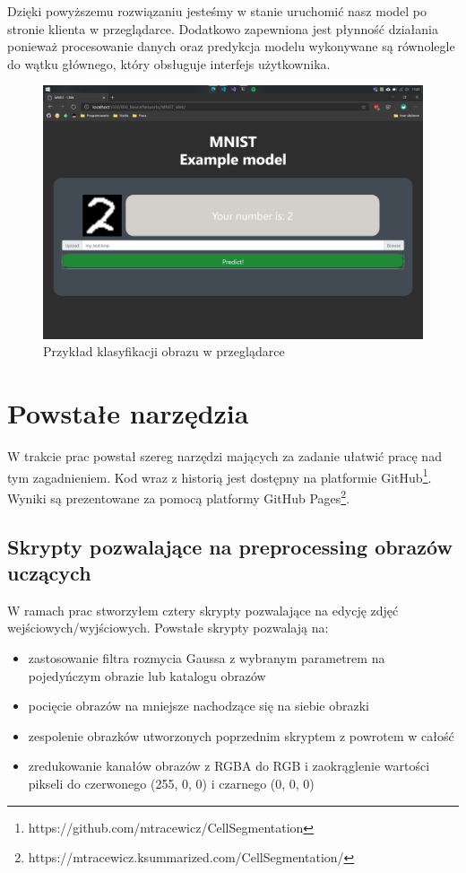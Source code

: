\documentclass{article}
\begin{document}
Dzięki powyższemu rozwiązaniu jesteśmy w stanie uruchomić nasz model po stronie klienta w przeglądarce.
Dodatkowo zapewniona jest płynność działania ponieważ procesowanie danych oraz predykcja modelu wykonywane są równolegle do wątku głównego, który obsługuje interfejs użytkownika.

\begin{figure}[H]
    \centering
    \includegraphics[width=\linewidth]{images/mnist.png}
    \caption{Przykład klasyfikacji obrazu w przeglądarce}
    \label{fig:mnist}
\end{figure}
\newpage
\section{Powstałe narzędzia}
W trakcie prac powstał szereg narzędzi mających za zadanie ułatwić pracę nad tym zagadnieniem.
Kod wraz z historią jest dostępny na platformie GitHub\footnote{https://github.com/mtracewicz/CellSegmentation}.
Wyniki są prezentowane za pomocą platformy GitHub Pages\footnote{https://mtracewicz.ksummarized.com/CellSegmentation/}.
\subsection{Skrypty pozwalające na preprocessing obrazów uczących}
W ramach prac stworzyłem cztery skrypty pozwalające na edycję zdjęć wejściowych/wyjściowych.
Powstałe skrypty pozwalają na:
\begin{itemize}
    \item zastosowanie filtra rozmycia Gaussa z wybranym parametrem na pojedyńczym obrazie lub katalogu obrazów
    \item pocięcie obrazów na mniejsze nachodzące się na siebie obrazki
    \item zespolenie obrazków utworzonych poprzednim skryptem z powrotem w całość
    \item zredukowanie kanałów obrazów z RGBA do RGB i zaokrąglenie wartości pikseli do czerwonego (255, 0, 0) i czarnego (0, 0, 0)
\end{itemize}
\end{document}
